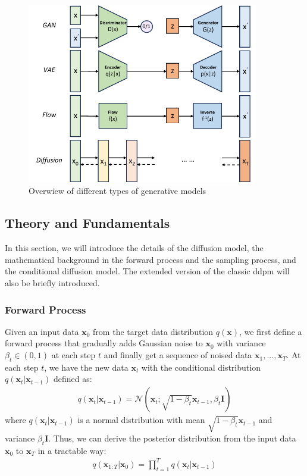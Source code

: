 \documentclass[12pt,DIV14,BCOR12mm,a4paper,footinclude=false,headinclude,parskip=half-,twoside,openright,cleardoublepage=empty,toc=index,bibliography=totoc,listof=totoc]{scrreprt}
\numberwithin{equation}{chapter}
\begin{document}
\begin{figure}[h]
	\centering
	\includegraphics[width=0.9\textwidth]{img/gen.pdf}
	\caption{Overwiew of different types of generative models}
	\label{img:gen}
\end{figure}

\subsection{Theory and Fundamentals}\label{sec:theory}
In this section, we will introduce the details of the diffusion model, the mathematical background in the forward process and the sampling process, and the conditional diffusion model. The extended version of the classic \gls{ddpm} will also be briefly introduced.

\subsubsection{Forward Process}
Given an input data $\mathbf{x}_{0}$ from the target data distribution $q(\mathbf{x})$, we first define a forward process that gradually adds Gaussian noise to $\mathbf{x}_{0}$ with variance $\beta_{t}\in (0, 1)$ at each step $t$ and finally get a sequence of noised data $\mathbf{x}_{1},...,\mathbf{x}_{T}$. At each step $t$, we have the new data $\mathbf{x}_{t}$ with the conditional distribution $q(\mathbf{x}_{t}|\mathbf{x}_{t-1})$ defined as:
\begin{align}
  q(\mathbf{x}_{t}|\mathbf{x}_{t-1}) = \mathcal{N}(\mathbf{x}_{t}; \sqrt{1-\beta_{t}}\mathbf{x}_{t-1}, \beta_{t}\mathbf{I})
\end{align}
where $q(\mathbf{x}_{t}|\mathbf{x}_{t-1})$ is a normal distribution with mean $\sqrt{1-\beta_{t}}\mathbf{x}_{t-1}$ and variance $\beta_{t}\mathbf{I}$. Thus, we can derive the posterior distribution from the input data $\mathbf{x}_{0}$ to $\mathbf{x}_{T}$ in a tractable way:
\begin{align}
  q(\mathbf{x}_{1:T}|\mathbf{x}_{0}) = \prod_{t=1}^{T}q(\mathbf{x}_{t}|\mathbf{x}_{t-1})
\end{align}
\end{document}
